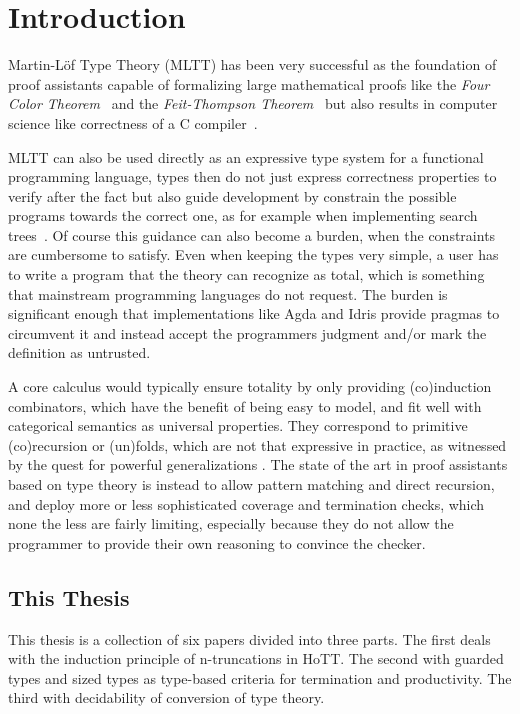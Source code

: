 \documentclass{book}
\begin{document}
\chapter{Introduction}

Martin-Löf Type Theory (MLTT) \cite{martinlof:72} has been very successful as
the foundation of proof assistants capable of formalizing large
mathematical proofs like the \emph{Four Color
  Theorem}~\cite{gonthier:ams08} and the \emph{Feit-Thompson
  Theorem}~\cite{gonthier:itp13} but also results in computer science 
like correctness of a C compiler~\cite{leroy:cacm09}.

MLTT can also be used directly as an expressive type system for a
functional programming language, types then do not just express
correctness properties to verify after the fact but also guide
development by constrain the possible programs towards the correct
one, as for example when implementing search trees~\cite{mcbride:icfp14}.
Of course this guidance can also become a burden, when the constraints
are cumbersome to satisfy. Even when keeping the types very simple, a
user has to write a program that the theory can recognize as total,
which is something that mainstream programming languages do not
request. The burden is significant enough that implementations like
Agda and Idris provide pragmas to circumvent it and instead accept the
programmers judgment and/or mark the definition as untrusted.

A core calculus would typically ensure totality by only providing
(co)induction combinators, which have the benefit of being easy to
model, and fit well with categorical semantics as universal
properties. They correspond to primitive (co)recursion or (un)folds,
which are not that expressive in practice, as witnessed by the quest
for powerful generalizations \cite{hinzeGibbons:icfp13}.
The state of the art in proof assistants based on type
theory is instead to allow pattern matching and direct recursion, and
deploy more or less sophisticated coverage and termination checks,
which none the less are fairly limiting, especially because they do
not allow the programmer to provide their own reasoning to convince
the checker.

\section{This Thesis}

This thesis is a collection of six papers divided into three parts.
The first deals with the induction principle of n-truncations in HoTT.
The second with guarded types and sized types as type-based criteria
for termination and productivity. The third with decidability of
conversion of type theory.
\end{document}
